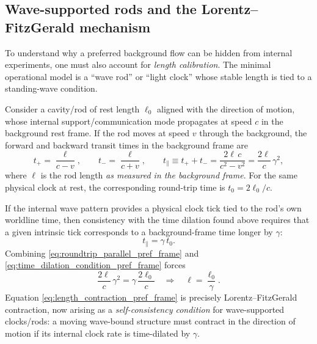 \documentclass[11pt]{article}
\begin{document}
\subsection{Wave-supported rods and the Lorentz--FitzGerald mechanism}
\label{sec:preferred_frame_length_contraction}

To understand why a preferred background flow can be hidden from internal experiments,
one must also account for \emph{length calibration}. The minimal operational model is a
``wave rod'' or ``light clock'' whose stable length is tied to a standing-wave condition.

Consider a cavity/rod of rest length $\ell_0$ aligned with the direction of motion, whose
internal support/communication mode propagates at speed $c$ in the background rest frame.
If the rod moves at speed $v$ through the background, the forward and backward transit times
in the background frame are
\begin{equation}
t_+ = \frac{\ell}{c-v},
\qquad
t_- = \frac{\ell}{c+v},
\qquad
t_{\parallel} \equiv t_+ + t_- = \frac{2\ell\,c}{c^2-v^2}
= \frac{2\ell}{c}\,\gamma^2,
\label{eq:roundtrip_parallel_pref_frame}
\end{equation}
where $\ell$ is the rod length \emph{as measured in the background frame}.
For the same physical clock at rest, the corresponding round-trip time is
$t_0 = 2\ell_0/c$.

If the internal wave pattern provides a physical clock tick tied to the rod's own
worldline time, then consistency with the time dilation found above requires that a
given intrinsic tick corresponds to a background-frame time longer by $\gamma$:
\begin{equation}
t_{\parallel} = \gamma\,t_0.
\label{eq:time_dilation_condition_pref_frame}
\end{equation}
Combining \eqref{eq:roundtrip_parallel_pref_frame} and \eqref{eq:time_dilation_condition_pref_frame}
forces
\begin{equation}
\frac{2\ell}{c}\,\gamma^2 = \gamma\,\frac{2\ell_0}{c}
\quad\Longrightarrow\quad
\ell = \frac{\ell_0}{\gamma}.
\label{eq:length_contraction_pref_frame}
\end{equation}
Equation \eqref{eq:length_contraction_pref_frame} is precisely Lorentz--FitzGerald contraction,
now arising as a \emph{self-consistency condition} for wave-supported clocks/rods:
a moving wave-bound structure must contract in the direction of motion if its internal
clock rate is time-dilated by $\gamma$.
\end{document}
